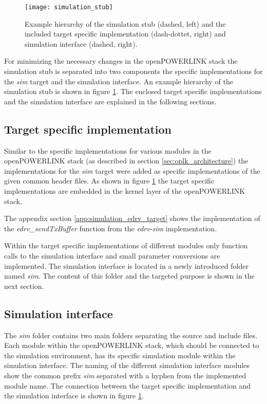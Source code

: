 \begin{figure}
    \centering
    \texttt{[image: simulation\_stub]}
    \caption{Example hierarchy of the simulation stub (dashed, left) and the included target specific implementation (dash-dottet, right) and simulation interface (dashed, right).}
    \label{fig:simulation_stub}
\end{figure}

For minimizing the necessary changes in the openPOWERLINK stack the simulation stub is separated into two components the specific implementations for the \emph{sim} target and the simulation interface.
An example hierarchy of the simulation stub is shown in figure \ref{fig:simulation_stub}.
The enclosed target specific implementations and the simulation interface are explained in the following sections.

\subsection{Target specific implementation}
\label{sec:porting_simstub_target}
\begin{sloppypar}
Similar to the specific implementations for various modules in the openPOWERLINK stack (as described in section \ref{sec:oplk_architecture}) the implementations for the \emph{sim} target were added as specific implementations of the given common header files.
As shown in figure \ref{fig:simulation_stub} the target specific implementations are embedded in the kernel layer of the openPOWERLINK stack.
\end{sloppypar}

\begin{sloppypar}
The appendix section \ref{app:simulation_edrv_target} shows the implementation of the \emph{edrv\_sendTxBuffer} function from the \emph{edrv-sim} implementation.
\end{sloppypar}

Within the target specific implementations of different modules only function calls to the simulation interface and small parameter conversions are implemented.
The simulation interface is located in a newly introduced folder named \emph{sim}.
The content of this folder and the targeted purpose is shown in the next section.

\subsection{Simulation interface}
\label{sec:porting_simstub_siminterface}
The \emph{sim} folder contains two main folders separating the source and include files.
Each module within the openPOWERLINK stack, which should be connected to the simulation environment, has its specific simulation module within the simulation interface.
The naming of the different simulation interface modules show the common prefix \emph{sim} separated with a hyphen from the implemented module name.
The connection between the target specific implementation and the simulation interface is shown in figure \ref{fig:simulation_stub}. 

